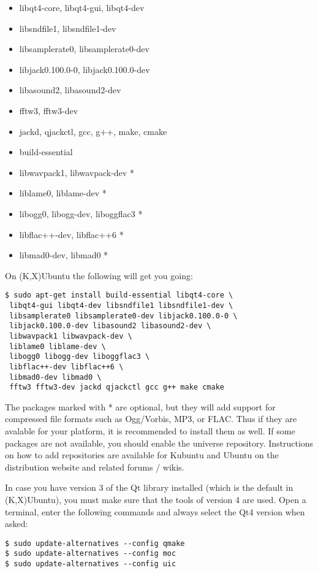 \begin{itemize}
 \item libqt4-core, libqt4-gui, libqt4-dev
 \item libsndfile1, libsndfile1-dev
 \item libsamplerate0, libsamplerate0-dev
 \item libjack0.100.0-0, libjack0.100.0-dev
 \item libasound2, libasound2-dev
 \item fftw3, fftw3-dev
 \item jackd, qjackctl, gcc, g++, make, cmake
 \item build-essential
 \item libwavpack1, libwavpack-dev *
 \item liblame0, liblame-dev *
 \item libogg0, libogg-dev, liboggflac3 *
 \item libflac++-dev, libflac++6 *
 \item libmad0-dev, libmad0 *
\end{itemize}
On (K,X)Ubuntu the following will get you going:
\begin{verbatim}
$ sudo apt-get install build-essential libqt4-core \
 libqt4-gui libqt4-dev libsndfile1 libsndfile1-dev \
 libsamplerate0 libsamplerate0-dev libjack0.100.0-0 \
 libjack0.100.0-dev libasound2 libasound2-dev \
 libwavpack1 libwavpack-dev \
 liblame0 liblame-dev \
 libogg0 libogg-dev liboggflac3 \
 libflac++-dev libflac++6 \
 libmad0-dev libmad0 \
 fftw3 fftw3-dev jackd qjackctl gcc g++ make cmake
\end{verbatim}
The packages marked with * are optional, but they will add support for compressed file formats such as Ogg/Vorbis, MP3, or FLAC. Thus if they are avalable for your platform, it is recommended to install them as well. If some packages are not available, you should enable the universe repository. Instructions on how to add repositories are available for Kubuntu and Ubuntu on the distribution website and related forums / wikis.

In case you have version 3 of the Qt library installed (which is the default in (K,X)Ubuntu), you must make sure that the tools of version 4 are used. Open a terminal, enter the following commands and always select the Qt4 version when asked:

\begin{verbatim}
$ sudo update-alternatives --config qmake
$ sudo update-alternatives --config moc
$ sudo update-alternatives --config uic
\end{verbatim}

